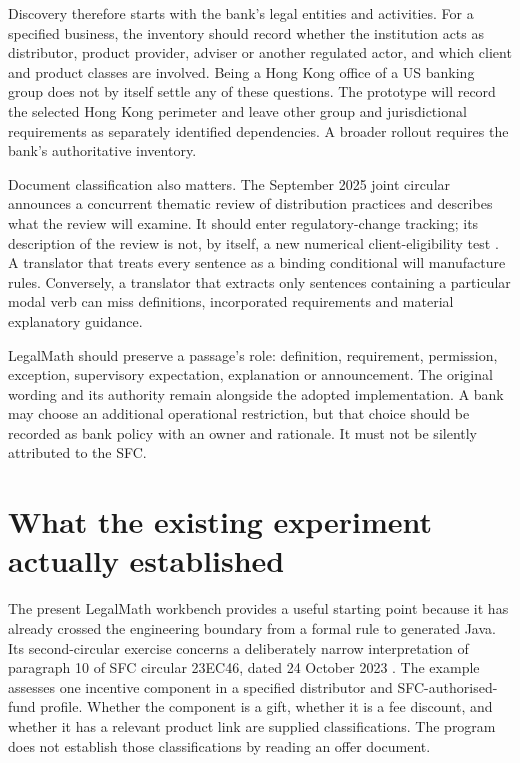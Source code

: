 Discovery therefore starts with the bank's legal entities and activities. For a
specified business, the inventory should record whether the institution acts as
distributor, product provider, adviser or another regulated actor, and which
client and product classes are involved. Being a Hong Kong office of a US banking
group does not by itself settle any of these questions. The prototype will record
the selected Hong Kong perimeter and leave other group and jurisdictional
requirements as separately identified dependencies. A broader rollout requires
the bank's authoritative inventory.


Document classification also matters. The September 2025 joint circular announces
a concurrent thematic review of distribution practices and describes what the
review will examine. It should enter regulatory-change tracking; its description
of the review is not, by itself, a new numerical client-eligibility test
\citep{sfcreview2025}. A translator that treats every sentence as a binding
conditional will manufacture rules. Conversely, a translator that extracts only
sentences containing a particular modal verb can miss definitions, incorporated
requirements and material explanatory guidance.

LegalMath should preserve a passage's role: definition, requirement, permission,
exception, supervisory expectation, explanation or announcement. The original
wording and its authority remain alongside the adopted implementation. A bank may
choose an additional operational restriction, but that choice should be recorded
as bank policy with an owner and rationale. It must not be silently attributed to
the SFC.

\section{What the existing experiment actually established}
\label{merge:M01:01}

\label{sec:problem-evidence}
The present LegalMath workbench provides a useful starting point because it has
already crossed the engineering boundary from a formal rule to generated Java.
Its second-circular exercise concerns a deliberately narrow interpretation of
paragraph 10 of SFC circular 23EC46, dated 24 October 2023
\citep{sfcmarketing}. The example assesses one incentive component in a specified
distributor and SFC-authorised-fund profile. Whether the component is a gift,
whether it is a fee discount, and whether it has a relevant product link are
supplied classifications. The program does not establish those classifications
by reading an offer document.

